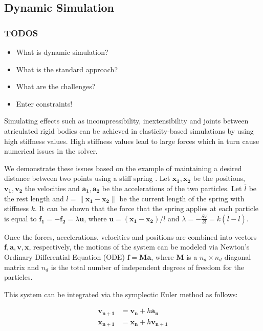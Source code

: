 \documentclass{article}
\begin{document}
\subsection*{Dynamic Simulation}
\subsubsection*{TODOS}
\begin{itemize}
    \item What is dynamic simulation?
    \item What is the standard approach?
    \item What are the challenges?
    \item Enter constraints!
\end{itemize}

Simulating effects such as incompressibility, inextensibility and joints between atriculated rigid bodies 
can be achieved in elasticity-based simulations by using high stiffness values. High stiffness values lead to 
large forces which in turn cause numerical issues in the solver. 

We demonstrate these issues based on the example of maintaining a desired distance between two points using a stiff 
spring \cite{tournier2015}. Let $\bm{x_1, x_2}$ be the positions, $\bm{v_1, v_2}$ the velocities and $\bm{a_1, a_2}$
be the accelerations of the two particles. Let $\overline{l}$ be the rest length and $l = \lVert \bm{x_1} - \bm{x_2} \rVert$ 
be the current length of the spring with stiffness $k$. It can be shown that the force that the spring applies at each particle
is equal to $\bm{f_1} = -\bm{f_2} = \lambda\bm{u}$, where $\bm{u} = (\bm{x_1} - \bm{x_2}) / l$
and $\lambda = -\frac{\delta V}{\delta l} = k(\overline{l} - l)$. 

Once the forces, accelerations, velocities and positions are combined into vectors $\bm{f}, \bm{a}, \bm{v}, \bm{x}$, 
respectively, the motions of the system can be modeled via Newton's Ordinary Differential Equation (ODE) $\bm{f} = \bm{Ma}$,
where $\bm{M}$ is a $n_d \times n_d$ diagonal matrix and $n_d$ is the total number of independent degrees of freedom for the 
particles.

This system can be integrated via the symplectic Euler method as follows:

\begin{align*}
    \bm{v_{n+1}} &= \bm{v_n} + h\bm{a_n} \\
    \bm{x_{n+1}} &= \bm{x_n} + h\bm{v_{n+1}}
\end{align*}
\end{document}
